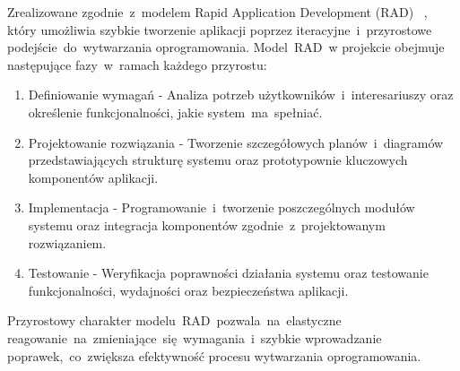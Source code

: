Zrealizowane zgodnie~z~modelem Rapid Application Development (RAD) ~\cite{sdlm}, który umożliwia szybkie tworzenie aplikacji poprzez iteracyjne~i~przyrostowe podejście~do~wytwarzania oprogramowania.
Model~RAD~w projekcie obejmuje następujące fazy~w~ramach każdego przyrostu:
\begin{enumerate}
    \item Definiowanie wymagań - Analiza potrzeb użytkowników~i~interesariuszy oraz określenie funkcjonalności, jakie system~ma~spełniać.
    \item Projektowanie rozwiązania - Tworzenie szczegółowych planów~i~diagramów przedstawiających strukturę systemu oraz prototypownie kluczowych komponentów aplikacji.
    \item Implementacja - Programowanie~i~tworzenie poszczególnych modułów systemu oraz integracja komponentów zgodnie~z~projektowanym rozwiązaniem.
    \item Testowanie - Weryfikacja poprawności działania systemu oraz testowanie funkcjonalności, wydajności oraz bezpieczeństwa aplikacji.
\end{enumerate}
Przyrostowy charakter modelu~RAD~pozwala~na~elastyczne reagowanie~na~zmieniające~się~wymagania~i~szybkie wprowadzanie poprawek,~co~zwiększa efektywność procesu wytwarzania oprogramowania.
